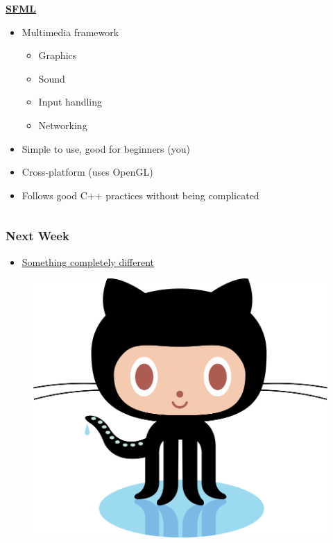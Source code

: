 \documentclass[glossy]{beamer}
\begin{document}
\begin{frame}[fragile=singleslide]
\begin{columns}[t]
    \begin{column}{4cm}
      \textbf{\href{http://www.sfml-dev.org/}{SFML}}
      \begin{itemize}
        \item Multimedia framework
        \begin{itemize}
          \item Graphics
          \item Sound
          \item Input handling
          \item Networking
        \end{itemize}
        \item Simple to use, good for beginners (you)
        \item Cross-platform (uses OpenGL)
        \item Follows good C++ practices without being complicated
      \end{itemize}
    \end{column}
  \end{columns}
\end{frame}


\begin{frame}[fragile=singleslide]
  \frametitle{Next Week}

  \begin{itemize}
    \item \href{http://git-scm.com/}{Something completely different}
  \end{itemize}

  \begin{figure}
    \centering
    \includegraphics[width=0.65\columnwidth]{octocat}
  \end{figure}
\end{frame}
\end{document}
